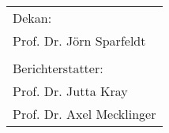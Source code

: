 \newpage
\thispagestyle{empty}
\vspace*{\fill}
\begin{tabular}{l}
                                                                                              \\  
    Dekan: \\
    Prof. Dr. Jörn Sparfeldt \\
    \\
    Berichterstatter: \\
    Prof. Dr. Jutta Kray \\
    Prof. Dr. Axel Mecklinger \\
\end{tabular}

